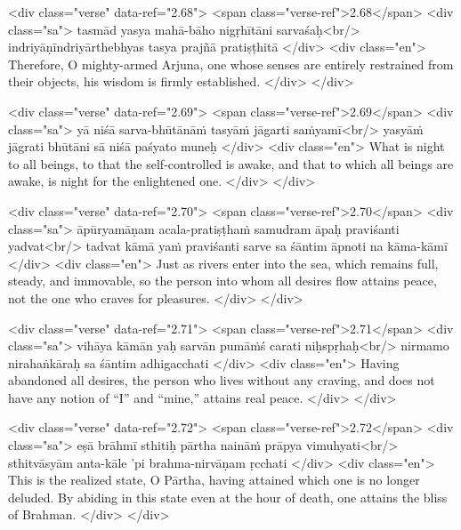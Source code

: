 \begin{html}
<div class="verse" data-ref="2.68">
  <span class="verse-ref">2.68</span>
  <div class="sa">
    tasmād yasya mahā-bāho nigṛhītāni sarvaśaḥ<br/>
    indriyāṇīndriyārthebhyas tasya prajñā pratiṣṭhitā
  </div>
  <div class="en">
    Therefore, O mighty-armed Arjuna, one whose senses are entirely restrained from their objects, his wisdom is firmly established.
  </div>
</div>
\end{html}



\begin{html}
<div class="verse" data-ref="2.69">
  <span class="verse-ref">2.69</span>
  <div class="sa">
    yā niśā sarva-bhūtānāṁ tasyāṁ jāgarti saṁyamī<br/>
    yasyāṁ jāgrati bhūtāni sā niśā paśyato muneḥ
  </div>
  <div class="en">
    What is night to all beings, to that the self-controlled is awake, and that to which all beings are awake, is night for the enlightened one.
  </div>
</div>
\end{html}



\begin{html}
<div class="verse" data-ref="2.70">
  <span class="verse-ref">2.70</span>
  <div class="sa">
    āpūryamāṇam acala-pratiṣṭhaṁ samudram āpaḥ praviśanti yadvat<br/>
    tadvat kāmā yaṁ praviśanti sarve sa śāntim āpnoti na kāma-kāmī
  </div>
  <div class="en">
    Just as rivers enter into the sea, which remains full, steady, and immovable, so the person into whom all desires flow attains peace, not the one who craves for pleasures.
  </div>
</div>
\end{html}



\begin{html}
<div class="verse" data-ref="2.71">
  <span class="verse-ref">2.71</span>
  <div class="sa">
    vihāya kāmān yaḥ sarvān pumāṁś carati niḥspṛhaḥ<br/>
    nirmamo nirahaṅkāraḥ sa śāntim adhigacchati
  </div>
  <div class="en">
    Having abandoned all desires, the person who lives without any craving, and does not have any notion of \enquote{I} and \enquote{mine,} attains real peace.
  </div>
</div>
\end{html}



\begin{html}
<div class="verse" data-ref="2.72">
  <span class="verse-ref">2.72</span>
  <div class="sa">
    eṣā brāhmī sthitiḥ pārtha naināṁ prāpya vimuhyati<br/>
    sthitvāsyām anta-kāle ’pi brahma-nirvāṇam ṛcchati
  </div>
  <div class="en">
    This is the realized state, O Pārtha, having attained which one is no longer deluded. By abiding in this state even at the hour of death, one attains the bliss of Brahman.
  </div>
</div>
\end{html}


